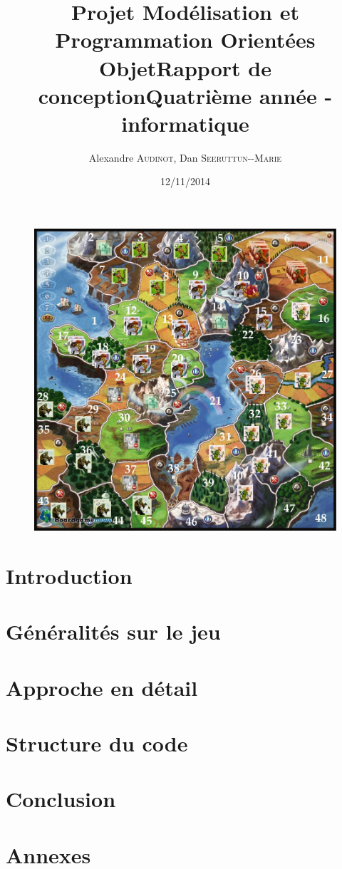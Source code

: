 \documentclass[12pt]{article}
\title{Projet Modélisation et Programmation Orientées Objet\smallbreak Rapport de conception\smallbreak Quatrième année - informatique }
\author{Alexandre \textsc{Audinot},  Dan \textsc{Seeruttun-{}-Marie}}
\date{12/11/2014}
\begin{document}
\maketitle

\begin{figure}[!h] 
\centerline{\includegraphics[scale=0.30]{img/cover.jpg}}
\end{figure}
\newpage

\newpage
\tableofcontents
\newpage
\newpage


\section{Introduction}

\newpage
\section{Généralités sur le jeu}

\newpage
\section{Approche en détail}

\newpage
\section{Structure du code}

\newpage
\section{Conclusion}

\newpage
\section{Annexes}

\end{document}
